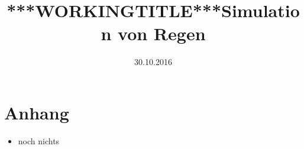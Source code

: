 \documentclass[a4paper,11pt]{report}
\title{***WORKINGTITLE***Simulation von Regen}
\author{\Autoren}
\date{30.10.2016}
\begin{document}

 
 
 
 
 
\tableofcontents %

\listoffigures


\renewcommand{\lstlistlistingname}{Listingverzeichnis}
\lstlistoflistings

\pagestyle{plain} %


\chapter*{Anhang}
	\label{cha:appendum}
    \begin{itemize}
    \item noch nichts
    \end{itemize}

\renewcommand{\bibname}{Externe Bibliotheken, technische Dokumente und Quellen}


\end{document}
